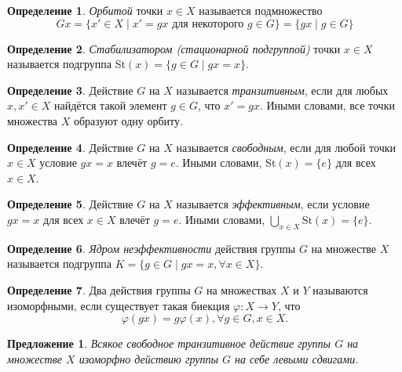 \documentclass[a4paper]{article}
\theoremstyle{plain}
\newtheorem{proposal}{Предложение}
\theoremstyle{definition}
\newtheorem{definition}{Определение}
\numberwithin{definition}{section}
\numberwithin{proposal}{section}
\begin{document}
\begin{definition}
\emph{Орбитой} точки \(x \in X\) называется подмножество
\begin{equation*}
	Gx = \{x' \in X \;|\; x' = gx \text{ для некоторого } g \in G\} = \{gx \;|\; g \in G\}
\end{equation*}
\end{definition}

\begin{definition}
\emph{Стабилизатором (стационарной подгруппой)} точки \(x \in X\) называется подгруппа St\((x) = \{g \in G \;|\; gx = x\}\).
\end{definition}

\begin{definition}
Действие \(G\) на \(X\) называется \emph{транзитивным}, если для любых \(x, x' \in X\) найдётся такой элемент \(g \in G\), что \(x' = gx\). Иными словами, все точки множества \(X\) образуют одну орбиту.
\end{definition}

\begin{definition}
Действие \(G\) на \(X\) называется \emph{свободным}, если для любой точки \(x \in X\) условие \(gx = x\) влечёт \(g = e\). Иными словами, St\((x) = \{e\}\) для всех \(x \in X\).
\end{definition}

\begin{definition}
Действие \(G\) на \(X\) называется \emph{эффективным}, если условие \(gx = x\) для всех \(x \in X\) влечёт \(g = e\). Иными словами, \(\bigcup_{x \in X} \mathrm{St}(x) = \{e\}\).
\end{definition}

\begin{definition}
\emph{Ядром неэффективности} действия группы \(G\) на множестве \(X\) называется подгруппа \(K = \{g \in G \;|\; gx = x, \forall x \in X\}\).
\end{definition}

\begin{definition}
Два действия группы \(G\) на множествах \(X\) и \(Y\) называются изоморфными, если существует такая биекция \(\varphi: X \rightarrow Y\), что
\begin{equation*}
	\varphi(gx) = g\varphi(x), \forall g \in G, x \in X.
\end{equation*}
\end{definition}

\begin{proposal}
Всякое свободное транзитивное действие группы \(G\) на множестве \(X\) изоморфно действию группы \(G\) на себе левыми сдвигами.
\end{proposal}
\end{document}
